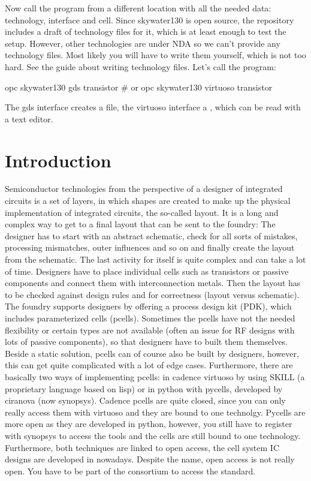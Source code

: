 Now call the program from a different location with all the needed data: technology, interface and cell. Since skywater130 is open source, the repository includes a
draft of technology files for it, which is at least enough to test the setup. However, other technologies are under NDA so we can't provide any technology files.
Most likely you will have to write them yourself, which is not too hard. See the guide about writing technology files. Let's call the program:
\begin{shellcode}
    opc skywater130 gds transistor
    # or
    opc skywater130 virtuoso transistor
\end{shellcode}
The gds interface creates a  file, the virtuoso interface a , which can be read with a text editor.

\section{Introduction}
Semiconductor technologies from the perspective of a designer of integrated circuits is a set of layers, in which shapes are created to make up the physical
implementation of integrated circuits, the so-called layout. It is a long and complex way to get to a final layout that can be sent to the foundry: The designer has
to start with an abstract schematic, check for all sorts of mistakes, processing mismatches, outer influences and so on and finally create the layout from the
schematic. The last activity for itself is quite complex and can take a lot of time. Designers have to place individual cells such as transistors or passive
components and connect them with interconnection metals. Then the layout has to be checked against design rules and for correctness (layout versus schematic).
The foundry supports designers by offering a process design kit (PDK), which includes parameterized cells (pcells). Sometimes the pcells have not the needed
flexibility or certain types are not available (often an issue for RF designs with lots of passive components), so that designers have to built them themselves.
Beside a static solution, pcells can of course also be built by designers, however, this can get quite complicated with a lot of edge cases. Furthermore, there are
basically two ways of implementing pcells: in cadence virtuoso by using SKILL (a proprietary language based on lisp) or in python with pycells, developed by ciranova
(now synopsys). Cadence pcells are quite closed, since you can only really access them with virtuoso and they are bound to one technolgy. Pycells are more open as
they are developed in python, however, you still have to register with synopsys to access the tools and the cells are still bound to one technology. Furthermore,
both techniques are linked to open access, the cell system IC designs are developed in nowadays. Despite the name, open access is not really open. You have to be
part of the consortium to access the standard.

